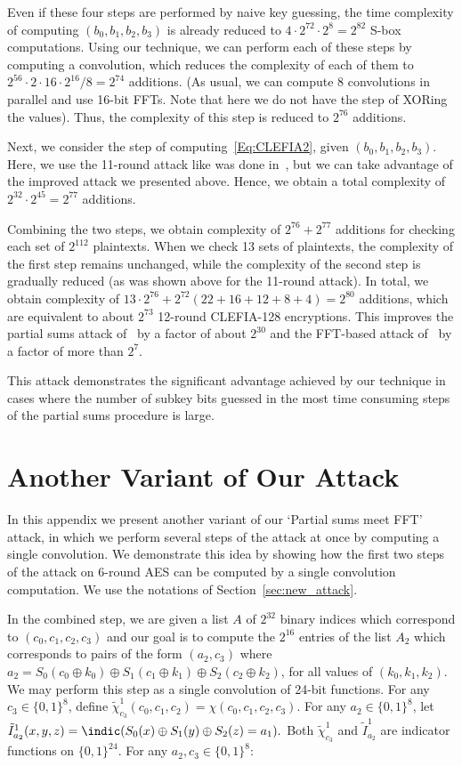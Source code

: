 Even if these four steps are performed by naive key guessing, the time complexity of computing $(b_0,b_1,b_2,b_3)$ is already reduced to $4 \cdot 2^{72} \cdot 2^8=2^{82}$ S-box computations. Using our technique, we can perform each of these steps by computing a convolution, which reduces the complexity of each of them to $2^{56} \cdot 2 \cdot 16 \cdot 2^{16}/8 = 2^{74}$ additions. (As usual, we can compute 8 convolutions in parallel and use 16-bit FFTs. Note that here we do not have the step of XORing the values). Thus, the complexity of this step is reduced to $2^{76}$ additions.

Next, we consider the step of computing~\eqref{Eq:CLEFIA2}, given $(b_0,b_1,b_2,b_3)$. Here, we use the 11-round attack like was done in~\cite{SAC:SasWan12}, but we can take advantage of the improved attack we presented above. Hence, we obtain a total complexity of $2^{32} \cdot 2^{45}=2^{77}$ additions. 

Combining the two steps, we obtain complexity of $2^{76}+2^{77}$ additions for checking each set of $2^{112}$ plaintexts. When we check 13 sets of plaintexts, the complexity of the first step remains unchanged, while the complexity of the second step is gradually reduced (as was shown above for the 11-round attack). In total, we obtain complexity of $13 \cdot 2^{76}+ 2^{72}(22+16+12+8+4)=2^{80}$ additions, which are equivalent to about $2^{73}$ 12-round CLEFIA-128 encryptions. This improves the partial sums attack of~\cite{SAC:SasWan12} by a factor of about $2^{30}$ and the FFT-based attack of~\cite{CANS:TodAok14} by a factor of more than $2^7$.

This attack demonstrates the significant advantage achieved by our technique in cases where the number of subkey bits guessed in the most time consuming steps of the partial sums procedure is large. 

\section{Another Variant of Our Attack}
\label{app:single-convolution}

In this appendix we present another variant of our `Partial sums meet FFT' attack, in which we perform several steps of the attack at once by computing a single convolution. We demonstrate this idea by showing how the first two steps of the attack on 6-round AES can be computed by a single convolution computation. We use the notations of Section~\ref{sec:new_attack}.

In the combined step, we are given a list $A$ of $2^{32}$ binary indices which correspond to $(c_0,c_1,c_2,c_3)$ and our goal is to compute the $2^{16}$ entries of the list $A_2$ which corresponds to pairs of the form $(a_2,c_3)$ where $a_2 = S_0(c_0 \oplus k_0) \oplus S_1(c_1 \oplus k_1) \oplus S_2(c_2 \oplus k_2)$, for all values of $(k_0,k_1,k_2)$. We may perform this step as a single convolution of 24-bit functions. For any $c_3 \in \{0,1\}^8$, define
$
\tilde{\chi}^1_{c_3}(c_0,c_1,c_2)=\chi(c_0,c_1,c_2,c_3).
$
For any $a_2 \in \{0,1\}^8$, let
$
\tilde{I}^1_{a_2}(x,y,z)=\indic(S_0(x) \oplus S_1(y) \oplus S_2(z) = a_1).
$
Both $\tilde{\chi}^1_{c_3}$ and $\tilde{I}^1_{a_2}$ are indicator functions on $\{0,1\}^{24}$. For any $a_2,c_3 \in \{0,1\}^8$: 

